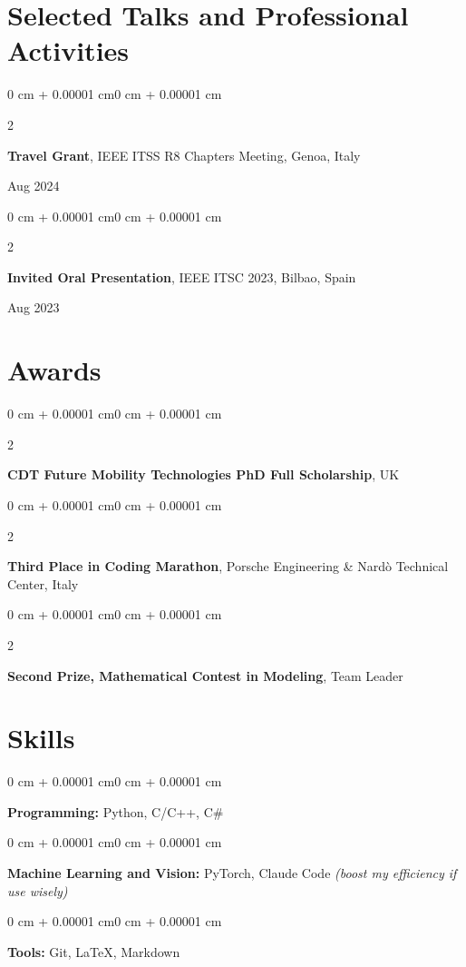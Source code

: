 \documentclass[10pt, letterpaper]{article}
\newenvironment{onecolentry}{
    \begin{adjustwidth}{0 cm + 0.00001 cm}{0 cm + 0.00001 cm}
}{
    \end{adjustwidth}
}
\newenvironment{twocolentry}[2][]{
    \onecolentry
    \def\secondColumn{#2}
    \setcolumnwidth{\fill, 6.5 cm}
    \begin{paracol}{2}
}{
    \switchcolumn \raggedleft \secondColumn
    \end{paracol}
    \endonecolentry
}
\begin{document}
\section{Selected Talks and Professional Activities}

\begin{twocolentry}{Aug 2024}
    \textbf{Travel Grant}, IEEE ITSS R8 Chapters Meeting, Genoa, Italy
\end{twocolentry}

\vspace{0.12cm}

\begin{twocolentry}{Aug 2023}
    \textbf{Invited Oral Presentation}, IEEE ITSC 2023, Bilbao, Spain
\end{twocolentry}

\section{Awards}

\begin{twocolentry}{2022}
    \textbf{CDT Future Mobility Technologies PhD Full Scholarship}, UK
\end{twocolentry}

\vspace{0.12cm}

\begin{twocolentry}{2023}
    \textbf{Third Place in Coding Marathon}, Porsche Engineering \& Nard\`o Technical Center, Italy
\end{twocolentry}

\vspace{0.12cm}

\begin{twocolentry}{2018}
    \textbf{Second Prize, Mathematical Contest in Modeling}, Team Leader
\end{twocolentry}

\section{Skills}

\begin{onecolentry}
    \textbf{Programming:} Python, C/C++, C\#
\end{onecolentry}

\vspace{0.10cm}

\begin{onecolentry}
    \textbf{Machine Learning and Vision:} PyTorch, Claude Code \textit{(boost my efficiency if use wisely)}
\end{onecolentry}

\vspace{0.10cm}

\begin{onecolentry}
    \textbf{Tools:} Git, LaTeX, Markdown
\end{onecolentry}
\end{document}
